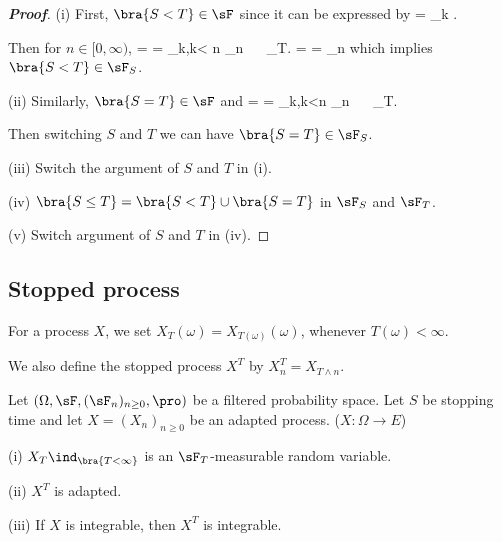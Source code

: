 \begin{proof}[\bf Proof]
\ben
\item [(i)] First, $\bra{S<T}\in \sF$ since it can be expressed by
\be
{} = \bigcup_{k\in \N} .
\ee

Then for $n\in [0,\infty)$,
\be
{} \cap {} =  = \bigcup_{k\in \N,k< n} \cap {} \in \sF_n \ \ra \   \in \sF_T.
\ee
\be
{} \cap {} =   \cup {} =  \cup {} \in \sF_n \nonumber
\ee
which implies $\bra{S<T}  \in \sF_S$.

\item [(ii)] Similarly, $\bra{S=T}\in \sF$ and
\be
{}\cap {} =  = \bigcup_{k\in \N,k<n} \cap {} \in \sF_n \ \ra \   \in \sF_T.
\ee

Then switching $S$ and $T$ we can have $\bra{S=T}  \in \sF_S$.

\item [(iii)] Switch the argument of $S$ and $T$ in (i).

\item [(iv)] $\bra{S\leq T} = \bra{S<T}\cup\bra{S=T}$ in $\sF_S$ and $\sF_T$.
\item [(v)] Switch argument of $S$ and $T$ in (iv).
\een
\end{proof}


\subsection{Stopped process}

\begin{definition}\label{def:stopped_process_discrete}
For a process $X$, we set $X_T (\omega) = X_{T(\omega)}(\omega)$, whenever $T(\omega) < \infty$.

We also define the stopped process $X^T$ by $X^T_n = X_{T\land n}$.
\end{definition}



\begin{proposition}
Let $(\Omega,\sF, (\sF_n)_{n\geq 0},\pro)$ be a filtered probability space. Let $S$ be stopping time and let $X = (X_n)_{n\geq 0}$ be an adapted process. ($X: \Omega \to E$)
\ben
\item [(i)] $X_T\ind_{\bra{T <\infty}}$ is an $\sF_T$-measurable random variable.
\item [(ii)] $X^T$ is adapted.
\item [(iii)] If $X$ is integrable, then $X^T$ is integrable.
\een
\end{proposition}

